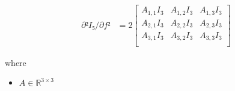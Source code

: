 \documentclass[12pt]{article}
\begin{document}
\begin{align*}
\textit{∂²I₅/∂f²} & = 2\begin{bmatrix}
\textit{A}_{1, 1}I_{ 3 } & \textit{A}_{1, 2}I_{ 3 } & \textit{A}_{1, 3}I_{ 3 }\\
\textit{A}_{2, 1}I_{ 3 } & \textit{A}_{2, 2}I_{ 3 } & \textit{A}_{2, 3}I_{ 3 }\\
\textit{A}_{3, 1}I_{ 3 } & \textit{A}_{3, 2}I_{ 3 } & \textit{A}_{3, 3}I_{ 3 }\\
\end{bmatrix}
\end{align*}

where
\begin{itemize}
\item $\textit{A} \in \mathbb{R}^{ 3 \times 3 }$
\end{itemize}
\end{document}
